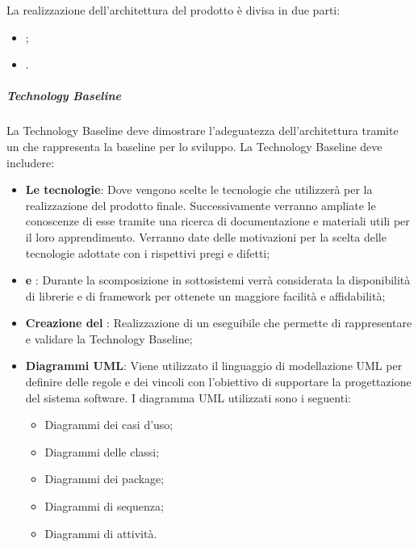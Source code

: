 La realizzazione dell’architettura del prodotto è divisa in due parti:
\begin{itemize}
	\item {};
	\item {}.
\end{itemize}

\subparagraph{Technology Baseline}
La Technology Baseline deve dimostrare l’adeguatezza dell’architettura tramite un  che rappresenta la baseline per lo sviluppo. 
La Technology Baseline deve includere:
\begin{itemize}
	\item \textbf{Le tecnologie}: Dove vengono scelte le tecnologie che \Gruppo{} utilizzerà per la realizzazione del prodotto finale. Successivamente verranno ampliate le conoscenze di esse tramite una ricerca di documentazione e materiali utili per il loro apprendimento. Verranno date delle motivazioni per la scelta delle tecnologie adottate con i rispettivi pregi e difetti;
	\item \textbf{ e }: Durante la scomposizione in sottosistemi verrà considerata la disponibilità di librerie e di framework per ottenete un maggiore facilità e affidabilità;
	\item \textbf{Creazione del }: Realizzazione di un eseguibile che permette di rappresentare e validare la Technology Baseline;
	\item \textbf{Diagrammi UML}: Viene utilizzato il linguaggio di modellazione UML per definire delle regole e dei vincoli con l'obiettivo di supportare la progettazione del sistema software. I diagramma UML utilizzati sono i seguenti:
	\begin{itemize}
		\item Diagrammi dei casi d'uso; 
		\item Diagrammi delle classi; 
		\item Diagrammi dei package;
		\item Diagrammi di sequenza; 
		\item Diagrammi di attività.
	\end{itemize}
\end{itemize}

